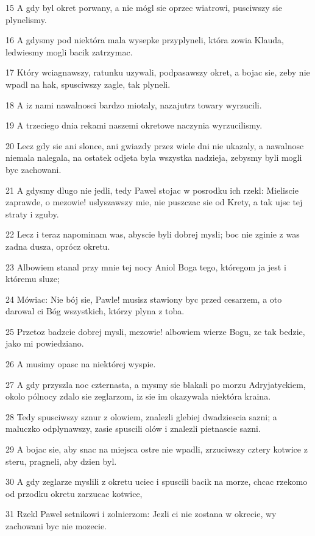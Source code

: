 \par 15 A gdy byl okret porwany, a nie mógl sie oprzec wiatrowi, pusciwszy sie plynelismy.
\par 16 A gdysmy pod niektóra mala wysepke przyplyneli, która zowia Klauda, ledwiesmy mogli bacik zatrzymac.
\par 17 Który wciagnawszy, ratunku uzywali, podpasawszy okret, a bojac sie, zeby nie wpadl na hak, spusciwszy zagle, tak plyneli.
\par 18 A iz nami nawalnosci bardzo miotaly, nazajutrz towary wyrzucili.
\par 19 A trzeciego dnia rekami naszemi okretowe naczynia wyrzucilismy.
\par 20 Lecz gdy sie ani slonce, ani gwiazdy przez wiele dni nie ukazaly, a nawalnosc niemala nalegala, na ostatek odjeta byla wszystka nadzieja, zebysmy byli mogli byc zachowani.
\par 21 A gdysmy dlugo nie jedli, tedy Pawel stojac w posrodku ich rzekl: Mieliscie zaprawde, o mezowie! uslyszawszy mie, nie puszczac sie od Krety, a tak ujsc tej straty i zguby.
\par 22 Lecz i teraz napominam was, abyscie byli dobrej mysli; boc nie zginie z was zadna dusza, oprócz okretu.
\par 23 Albowiem stanal przy mnie tej nocy Aniol Boga tego, któregom ja jest i któremu sluze;
\par 24 Mówiac: Nie bój sie, Pawle! musisz stawiony byc przed cesarzem, a oto darowal ci Bóg wszystkich, którzy plyna z toba.
\par 25 Przetoz badzcie dobrej mysli, mezowie! albowiem wierze Bogu, ze tak bedzie, jako mi powiedziano.
\par 26 A musimy opasc na niektórej wyspie.
\par 27 A gdy przyszla noc czternasta, a mysmy sie blakali po morzu Adryjatyckiem, okolo pólnocy zdalo sie zeglarzom, iz sie im okazywala niektóra kraina.
\par 28 Tedy spusciwszy sznur z olowiem, znalezli glebiej dwadziescia sazni; a maluczko odplynawszy, zasie spuscili olów i znalezli pietnascie sazni.
\par 29 A bojac sie, aby snac na miejsca ostre nie wpadli, zrzuciwszy cztery kotwice z steru, pragneli, aby dzien byl.
\par 30 A gdy zeglarze myslili z okretu uciec i spuscili bacik na morze, chcac rzekomo od przodku okretu zarzucac kotwice,
\par 31 Rzekl Pawel setnikowi i zolnierzom: Jezli ci nie zostana w okrecie, wy zachowani byc nie mozecie.
